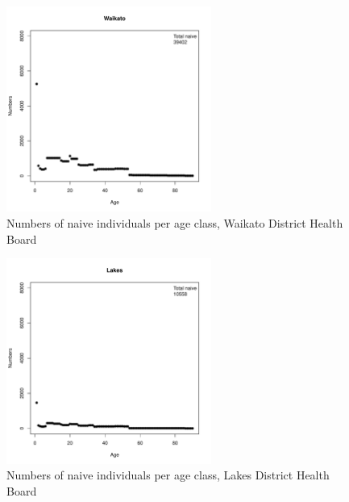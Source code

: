 \documentclass{article}
\begin{document}
\begin{figure}
     \begin{center}
     \includegraphics[width=0.6\textwidth]{dhb5.pdf}
     \end{center}
     \caption{Numbers of naive individuals per age class, Waikato District Health Board}
     \label{fig:Waikato}
\end{figure}

\begin{figure}
     \begin{center}
     \includegraphics[width=0.6\textwidth]{dhb6.pdf}
     \end{center}
     \caption{Numbers of naive individuals per age class, Lakes District Health Board}
     \label{fig:Lakes}
\end{figure}
\end{document}
